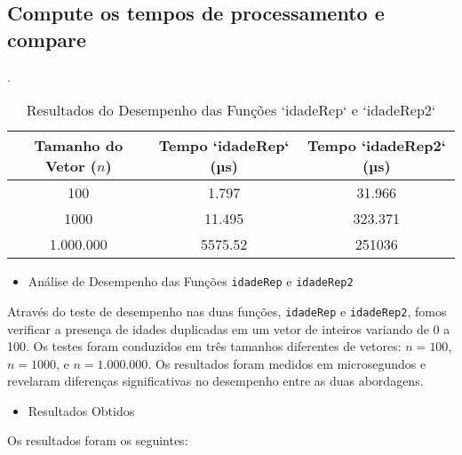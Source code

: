 \subsection{Compute os tempos de processamento e compare}

\begin{table}[ht]
    \centering
    \caption{Resultados do Desempenho das Funções `idadeRep` e `idadeRep2`}.

    \begin{tabular}{@{}ccc@{}}
        \toprule
        Tamanho do Vetor (\(n\)) & Tempo `idadeRep` (µs) & Tempo `idadeRep2` (µs) \\ \midrule
        100       & 1.797               & 31.966               \\
        1000      & 11.495              & 323.371              \\
        1.000.000 & 5575.52             & 251036               \\ \bottomrule
    \end{tabular}
    \label{tab:resultados}
\end{table}

\begin{itemize}
    \item Análise de Desempenho das Funções \texttt{idadeRep} e \texttt{idadeRep2}
\end{itemize}
Através do teste de desempenho nas duas funções, \texttt{idadeRep} e \texttt{idadeRep2}, fomos verificar a presença de idades duplicadas em um vetor de inteiros variando de 0 a 100. Os testes foram conduzidos em três tamanhos diferentes de vetores: \( n = 100 \), \( n = 1000 \), e \( n = 1.000.000 \). Os resultados foram medidos em microsegundos e revelaram diferenças significativas no desempenho entre as duas abordagens.

\begin{itemize}
    \item Resultados Obtidos
\end{itemize}
Os resultados foram os seguintes:

